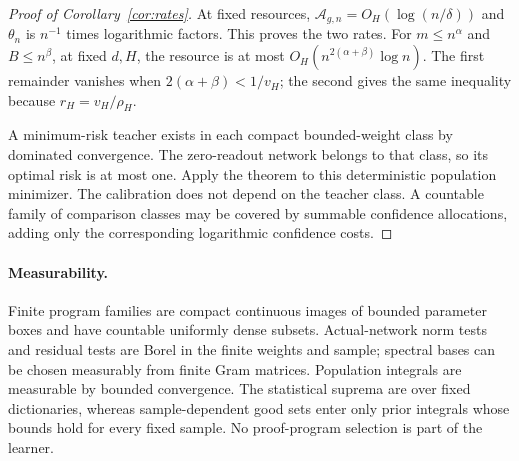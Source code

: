 \begin{proof}[Proof of Corollary~\ref{cor:rates}]
At fixed resources, $\mathcal A_{g,n}=O_H(\log(n/\delta))$ and $\theta_n$ is $n^{-1}$ times logarithmic factors. This proves the two rates. For $m\le n^\alpha$ and $B\le n^\beta$, at fixed $d,H$, the resource is at most $O_H(n^{2(\alpha+\beta)}\log n)$. The first remainder vanishes when $2(\alpha+\beta)<1/v_H$; the second gives the same inequality because $r_H=v_H/\rho_H$.

A minimum-risk teacher exists in each compact bounded-weight class by dominated convergence. The zero-readout network belongs to that class, so its optimal risk is at most one. Apply the theorem to this deterministic population minimizer. The calibration does not depend on the teacher class. A countable family of comparison classes may be covered by summable confidence allocations, adding only the corresponding logarithmic confidence costs.
\end{proof}

\paragraph{Measurability.}
Finite program families are compact continuous images of bounded parameter boxes and have countable uniformly dense subsets. Actual-network norm tests and residual tests are Borel in the finite weights and sample; spectral bases can be chosen measurably from finite Gram matrices. Population integrals are measurable by bounded convergence. The statistical suprema are over fixed dictionaries, whereas sample-dependent good sets enter only prior integrals whose bounds hold for every fixed sample. No proof-program selection is part of the learner.
